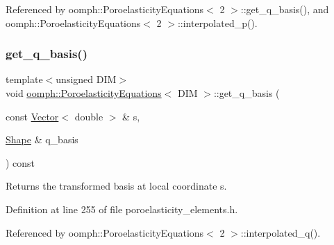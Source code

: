 Referenced by oomph\+::\+Poroelasticity\+Equations$<$ 2 $>$\+::get\+\_\+q\+\_\+basis(), and oomph\+::\+Poroelasticity\+Equations$<$ 2 $>$\+::interpolated\+\_\+p().

\mbox{\label{classoomph_1_1PoroelasticityEquations_ab027d56e9fc87ca73290002c10c173df}} 
\subsubsection{\texorpdfstring{get\+\_\+q\+\_\+basis()}{get\_q\_basis()}}
{\footnotesize\ttfamily template$<$unsigned D\+IM$>$ \\
void \hyperlink{classoomph_1_1PoroelasticityEquations}{oomph\+::\+Poroelasticity\+Equations}$<$ D\+IM $>$\+::get\+\_\+q\+\_\+basis (\begin{DoxyParamCaption}\item[{const \hyperlink{classoomph_1_1Vector}{Vector}$<$ double $>$ \&}]{s,  }\item[{\hyperlink{classoomph_1_1Shape}{Shape} \&}]{q\+\_\+basis }\end{DoxyParamCaption}) const\hspace{0.3cm}{\ttfamily [inline]}}



Returns the transformed basis at local coordinate s. 



Definition at line 255 of file poroelasticity\+\_\+elements.\+h.



Referenced by oomph\+::\+Poroelasticity\+Equations$<$ 2 $>$\+::interpolated\+\_\+q().

\mbox{\label{classoomph_1_1PoroelasticityEquations_ab1784901ec76efaefc0a4b3f12cd9078}} 

